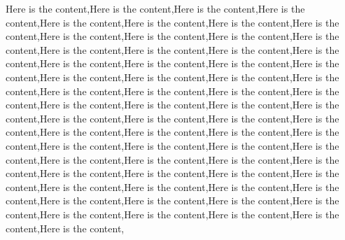 \documentclass[onecolumn]{article}
\begin{document}
\newpage

Here is the content,Here is the content,Here is the content,Here is the content,Here is the content,Here is the content,Here is the content,Here is the content,Here is the content,Here is the content,Here is the content,Here is the content,Here is the content,Here is the content,Here is the content,Here is the content,Here is the content,Here is the content,Here is the content,Here is the content,Here is the content,Here is the content,Here is the content,Here is the content,Here is the content,Here is the content,Here is the content,Here is the content,Here is the content,Here is the content,Here is the content,Here is the content,Here is the content,Here is the content,Here is the content,Here is the content,Here is the content,Here is the content,Here is the content,Here is the content,Here is the content,Here is the content,Here is the content,Here is the content,Here is the content,Here is the content,Here is the content,Here is the content,Here is the content,Here is the content,Here is the content,Here is the content,Here is the content,Here is the content,Here is the content,Here is the content,Here is the content,Here is the content,Here is the content,Here is the content,Here is the content,Here is the content,Here is the content,Here is the content,Here is the content,
\end{document}

